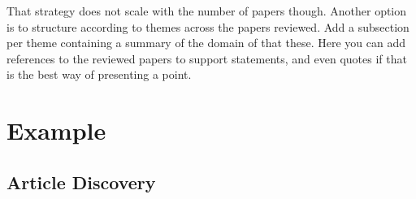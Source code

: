\documentclass[a4paper, oneside]{memoir}
\begin{document}
That strategy does not scale with the number of papers though. Another option is to structure according to themes across the papers reviewed. Add a subsection per theme containing a summary of the domain of that these. Here you can add references to the reviewed papers to support statements, and even quotes if that is the best way of presenting a point.


\section{Example}

\subsection{Article Discovery}
\end{document}
